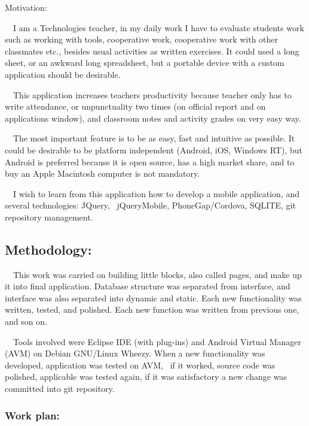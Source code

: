 \documentclass[a4paper]{article}
\begin{document}
\bigskip

Motivation:

\ \ I am a Technologies teacher, in my daily work I have to evaluate
students work such as working with tools, cooperative work, cooperative
work with other classmates etc., besides usual activities as written
exercises. It could used a long sheet, or an awkward long spreadsheet,
but a portable device with a custom application should be desirable.

\ \ This application increases teacher{\textquotesingle}s productivity
because teacher only has to write attendance, or unpunctuality two
times (on official report and on application{\textquotesingle}s
window), and classroom notes and activity grades on very easy way.

\ \ The most important feature is to be as easy, fast and intuitive as
possible. It could be desirable to be platform independent (Android,
iOS, Windows RT), but Android is preferred because it is open source,
has a high market share, and to buy an Apple Macintosh computer is not
mandatory.

\ \ I wish to learn from this application how to develop a mobile
application, and several technologies: JQuery, \ jQueryMobile,
PhoneGap/Cordova, SQLITE, git repository management.


\bigskip

\subsection[Methodology:]{Methodology:}
\hypertarget{RefHeading115481570052158}{}\ \ This work was carried on
building little blocks, also called pages, and make up it into final
application. Database structure was separated from interface, and
interface was also separated into dynamic and static. Each new
functionality was written, tested, and polished. Each new function was
written from previous one, and son on.

\ \ Tools involved were Eclipse IDE (with plug-ins) and Android Virtual
Manager (AVM) on Debian GNU/Linux Wheezy. When a new functionality was
developed, application was tested on AVM, \ if it worked, source code
was polished, applicable was tested again, if it was satisfactory a new
change was committed into git repository. 

\subsubsection[Work plan:]{Work plan:}
\hypertarget{RefHeading149931801272074}{}
\bigskip
\end{document}
